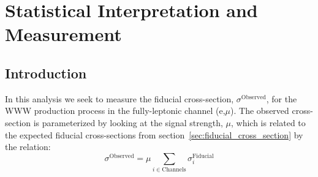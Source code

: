 

\section{Statistical Interpretation and Measurement}
\label{sec:statistics}
\newcommand*\Diff[1]{\mathop{}\!\mathrm{d}#1~}
\newcommand{\boldtheta}{\boldsymbol{\theta}}
\newcommand{\thetas}{\boldsymbol{\theta}_s}
\newcommand{\thetab}{\boldsymbol{\theta}_b}
\newcommand{\curlyl}{\mathcal{L}}

\subsection{Introduction}
In this analysis we seek to measure the fiducial cross-section, $\sigma^{\textrm{Observed}}$, for the WWW production process in the fully-leptonic channel (e,$\mu$).
The observed cross-section is parameterized by looking at the signal
strength, $\mu$, which is related to the expected fiducial cross-sections
from section~\ref{sec:fiducial_cross_section} by the relation:
\begin{equation}
\sigma^{\textrm{Observed}} = \mu \sum_{i\in \textrm{Channels}} \sigma^{\textrm{Fiducial}}_i
\end{equation}


